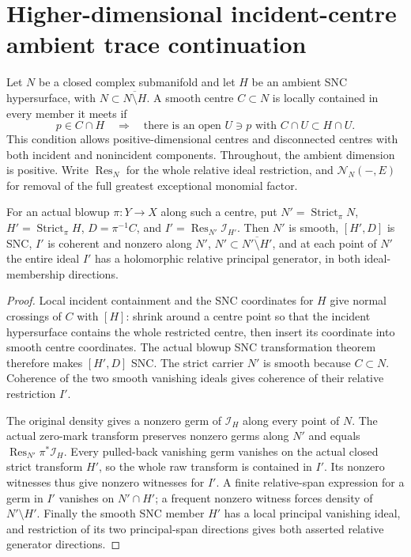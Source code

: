\section{Higher-dimensional incident-centre ambient trace continuation}

Let $N$ be a closed complex submanifold and let $H$ be an ambient SNC
hypersurface, with $N\subset\overline{N\setminus H}$.  A smooth centre
$C\subset N$ is locally contained in every member it meets if
\[
 p\in C\cap H\quad\Longrightarrow\quad
 \text{there is an open }U\ni p\text{ with }C\cap U\subset H\cap U.
\]
This condition allows positive-dimensional centres and disconnected centres
with both incident and nonincident components.  Throughout, the ambient
dimension is positive.  Write $\operatorname{Res}_N$ for the whole
relative ideal restriction, and $\mathcal N_N(-,E)$ for removal of the
full greatest exceptional monomial factor.

\begin{lemma}
\label{hir:sharp-actual-incident-centre-whole-trace-geometry}
\leanok
For an actual blowup $\pi:Y\to X$ along such a centre, put
$N'=\operatorname{Strict}_\pi N$, $H'=\operatorname{Strict}_\pi H$,
$D=\pi^{-1}C$, and $I'=\operatorname{Res}_{N'}\mathcal I_{H'}$.
Then $N'$ is smooth, $[H',D]$ is SNC, $I'$ is coherent and nonzero
along $N'$, $N'\subset\overline{N'\setminus H'}$, and at each point
of $N'$ the entire ideal $I'$ has a holomorphic relative principal
generator, in both ideal-membership directions.
\end{lemma}
\begin{proof}
Local incident containment and the SNC coordinates for $H$ give normal
crossings of $C$ with $[H]$: shrink around a centre point so that the
incident hypersurface contains the whole restricted centre, then insert
its coordinate into smooth centre coordinates.  The actual blowup SNC
transformation theorem therefore makes $[H',D]$ SNC.  The strict carrier
$N'$ is smooth because $C\subset N$.  Coherence of the two smooth
vanishing ideals gives coherence of their relative restriction $I'$.

The original density gives a nonzero germ of $\mathcal I_H$ along every
point of $N$.  The actual zero-mark transform preserves nonzero germs
along $N'$ and equals $\operatorname{Res}_{N'}\pi^*\mathcal I_H$.
Every pulled-back vanishing germ vanishes on the actual closed strict
transform $H'$, so the whole raw transform is contained in $I'$.
Its nonzero witnesses thus give nonzero witnesses for $I'$.  A finite
relative-span expression for a germ in $I'$ vanishes on $N'\cap H'$;
a frequent nonzero witness forces density of $N'\setminus H'$.
Finally the smooth SNC member $H'$ has a local principal vanishing
ideal, and restriction of its two principal-span directions gives both
asserted relative generator directions.
\end{proof}

